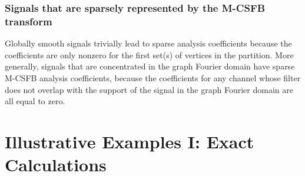 \documentclass[journal, 10pt]{IEEEtran}
\begin{document}
\subsubsection{Signals that are sparsely represented by the M-CSFB transform}
Globally smooth signals trivially lead to sparse analysis coefficients because the coefficients are only nonzero for the first set(s) of vertices in the partition. More generally, signals that are concentrated in the graph Fourier domain %
have sparse M-CSFB analysis coefficients, because the coefficients for any channel whose filter does not overlap with the support of the signal in the graph Fourier domain are all equal to zero. %

\section{Illustrative Examples I: Exact Calculations} \label{Se:ill1}
\end{document}
